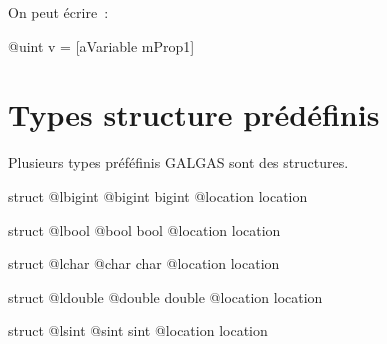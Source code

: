 On peut écrire~:
\begin{galgas3}
@uint v = [aVariable mProp1]
\end{galgas3}








\section{Types structure prédéfinis}

Plusieurs types préféfinis GALGAS sont des structures.


\begin{galgas3}
struct @lbigint {
  @bigint bigint
  @location location
}
\end{galgas3}




\begin{galgas3}
struct @lbool {
  @bool bool
  @location location
}
\end{galgas3}




\begin{galgas3}
struct @lchar {
  @char char
  @location location
}
\end{galgas3}



\begin{galgas3}
struct @ldouble {
  @double double
  @location location
}
\end{galgas3}








\begin{galgas3}
struct @lsint {
  @sint sint
  @location location
}
\end{galgas3}









